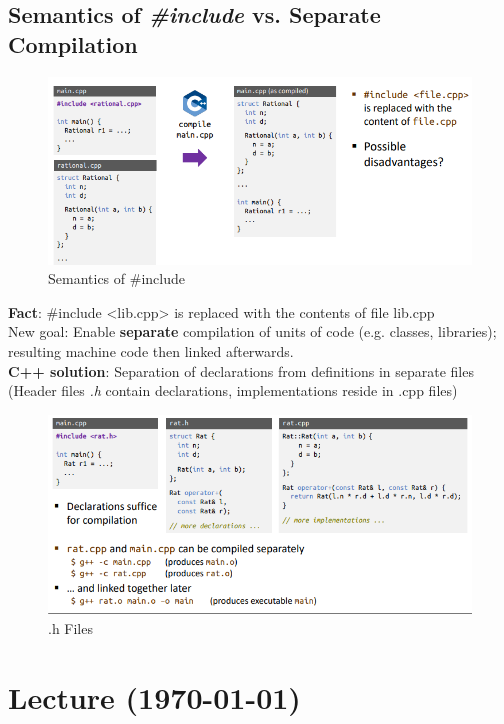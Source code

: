 \documentclass[a4paper,10pt]{article}
\begin{document}
\subsection{Semantics of \textit{\#include} vs. Separate Compilation}
\begin{figure}[htp]
    \centering
    \includegraphics[width=15cm]{e6.png}
    \caption{Semantics of \#include}
    \label{fig:enter-label}
\end{figure}
\textbf{Fact}: \#include <lib.cpp> is replaced with the contents of file lib.cpp\\
New goal: Enable \textbf{separate} compilation of units of code (e.g. classes, libraries); resulting machine code then linked afterwards.\\
\textbf{C++ solution}:  Separation of declarations from definitions in separate files (Header files \textit{.h} contain declarations, implementations reside in .cpp files)
\begin{figure}[htp]
    \centering
    \includegraphics[width=16cm]{e7.png}
    \caption{.h Files}
    \label{fig:enter-label}
\end{figure}
\section{Lecture (\today)}
\end{document}
